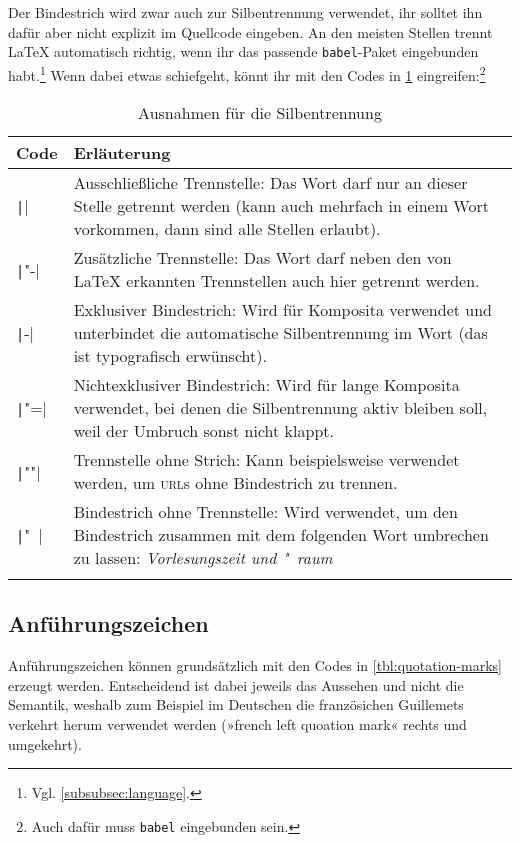Der Bindestrich wird zwar auch zur Silbentrennung verwendet, ihr solltet ihn dafür aber nicht explizit im Quellcode eingeben.
An den meisten Stellen trennt \LaTeX{} automatisch richtig, wenn ihr das passende \texttt{babel}-Paket eingebunden habt.\footnote{Vgl. \cref{subsubsec:language}.}
Wenn dabei etwas schiefgeht, könnt ihr mit den Codes in \cref{tbl:separators} eingreifen:\footnote{Auch dafür muss \texttt{babel} eingebunden sein.}

\begin{longtable}{@{}lp{11cm}@{}}
	\toprule
	Code      & Erläuterung \\
	\midrule
	\endhead
	\texttt|\-| & Ausschließliche Trennstelle: Das Wort darf nur an dieser Stelle getrennt werden (kann auch mehrfach in einem Wort vorkommen, dann sind alle Stellen erlaubt). \\
	\texttt|"-| & Zusätzliche Trennstelle: Das Wort darf neben den von \LaTeX{} erkannten Trennstellen auch hier getrennt werden. \\
	\texttt|-|  & Exklusiver Bindestrich: Wird für Komposita verwendet und unterbindet die automatische Silbentrennung im Wort (das ist typografisch erwünscht). \\
	\texttt|"=| & Nichtexklusiver Bindestrich: Wird für lange Komposita verwendet, bei denen die Silbentrennung aktiv bleiben soll, weil der Umbruch sonst nicht klappt. \\
	\texttt|""| & Trennstelle ohne Strich: Kann beispielsweise verwendet werden, um \textsc{url}s ohne Bindestrich zu trennen. \\
	\texttt|"~| & Bindestrich ohne Trennstelle: Wird verwendet, um den Bindestrich zusammen mit dem folgenden Wort umbrechen zu lassen: \emph{Vorlesungszeit und "~raum} \\
	\bottomrule
	\caption{Ausnahmen für die Silbentrennung}
	\label{tbl:separators}
\end{longtable}

\subsection{Anführungszeichen}
Anführungszeichen können grundsätzlich mit den Codes in \cref{tbl:quotation-marks} erzeugt werden.
Entscheidend ist dabei jeweils das Aussehen und nicht die Semantik, weshalb zum Beispiel im Deutschen die französichen Guillemets verkehrt herum verwendet werden (»french left quoation mark« rechts und umgekehrt).

